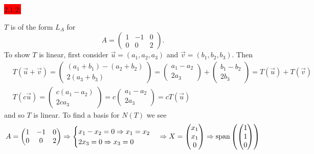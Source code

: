 \documentclass{exam}
\begin{document}
  \colorbox{red}{\underline{$2.1.2$}:}
  \begin{solution}
    $T$ is of the form $L_A$ for 
    \[
      A = \begin{pmatrix}
        1 & -1 & 0 \\
        0 & 0 & 2
      \end{pmatrix}.
    \]
    To show $T$ is linear, first consider $\vec{u} = (a_1, a_2, a_3)$ and $\vec{v} = (b_1, b_2, b_3)$. Then
    \begin{align*}
      &T(\vec{u} + \vec{v}) = \begin{pmatrix}
        (a_1 + b_1) - (a_2 + b_2) \\
        2(a_3 + b_3)
      \end{pmatrix}
      = \begin{pmatrix}
        a_1 - a_2 \\
        2a_3
      \end{pmatrix}
      + \begin{pmatrix}
        b_1 - b_2 \\
        2b_3
      \end{pmatrix}
      = T(\vec{u}) + T(\vec{v}) \\
      &T(c\vec{u}) = \begin{pmatrix}
        c(a_1 - a_2) \\ 2ca_3
      \end{pmatrix}
      = c\begin{pmatrix}
        a_1 - a_2 \\ 2a_3
      \end{pmatrix} 
      = cT(\vec{u})
    \end{align*}
    and so $T$ is linear. To find a basis for $N(T)$ we see 
    \[
      A = \begin{pmatrix}
        1 & -1 & 0 \\
        0 & 0 & 2
      \end{pmatrix} 
      \Rightarrow \begin{cases}
        x_1 - x_2 = 0 \Rightarrow x_1 = x_2 \\
        2x_3 = 0 \Rightarrow x_3 = 0
      \end{cases}
      \Rightarrow X = \begin{pmatrix}
        x_1 \\ x_1 \\ 0
      \end{pmatrix}
      \Rightarrow \text{span}\left({\begin{pmatrix}
        1 \\ 1 \\ 0

\end{pmatrix}}\right)\]
\end{solution}
\end{document}
